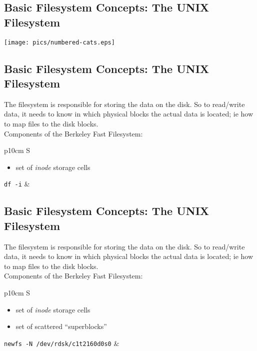 \documentclass[xga]{xdvislides}
\begin{document}
\subsection{Basic Filesystem Concepts: The UNIX Filesystem}
\vspace*{\fill}
\begin{center}
\texttt{[image: pics/numbered-cats.eps]} \\
\end{center}
\vspace*{\fill}

\subsection{Basic Filesystem Concepts: The UNIX Filesystem}
The filesystem is responsible for storing the data on the disk.
So to read/write data, it needs to know in which physical blocks the actual
data is located; ie how to map files to the disk blocks.
\\

Components of the Berkeley Fast Filesystem:
\\

\begin{tabular}{ p{10cm} S }
\begin{itemize}
	\item set of {\em inode} storage cells
\end{itemize}
{\tt df -i}
&  \\
\end{tabular}

\subsection{Basic Filesystem Concepts: The UNIX Filesystem}
The filesystem is responsible for storing the data on the disk.
So to read/write data, it needs to know in which physical blocks the actual
data is located; ie how to map files to the disk blocks.
\\

Components of the Berkeley Fast Filesystem:
\\

\begin{tabular}{ p{10cm} S }
\begin{itemize}
	\item set of {\em inode} storage cells
	\item set of scattered ``superblocks''
\end{itemize}
{\tt newfs -N /dev/rdsk/c1t2160d0s0}
&  \\
\end{tabular}
\end{document}
